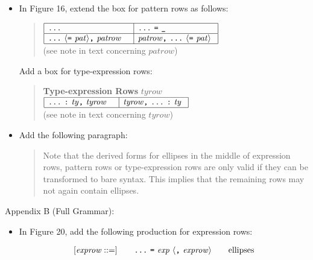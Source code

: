 \documentclass[twoside,titlepage]{article}
\newcommand{\void}[1]{}
\begin{document}
\begin{appendix}
\begin{itemize}
\item In Figure 16, extend the box for pattern rows as follows: 
  \begin{quote}
  $\begin{array}{|l|l|}
  \hline
  \mbox{\tt...}
  & \mbox{\tt...}~\mbox{\tt=}~\mbox{\tt\_} \\
  \hline
  \mbox{\tt...}~\langle\mbox{\tt=}~\mathit{pat}\rangle\mbox{\tt,}~\mathit{patrow}~~~
  & \mathit{patrow}\mbox{\tt,}~\mbox{\tt...}~\langle\mbox{\tt=}~\mathit{pat}\rangle~ \\
  \hline
  \end{array}$ \\
  (see note in text concerning $\mathit{patrow}$)
  \end{quote}
  Add a box for type-expression rows: 
  \begin{quote}
  {\bf Type-expression Rows} $\mathit{tyrow}$ \\
  $\begin{array}{|l|l|}
  \hline
  \mbox{\tt...}~\mbox{\tt:}~\mathit{ty}\mbox{\tt,}~\mathit{tyrow}~~~
  & \mathit{tyrow}\mbox{\tt,}~\mbox{\tt...}~\mbox{\tt:}~\mathit{ty}~ \\
  \hline
  \end{array}$ \\
  (see note in text concerning $\mathit{tyrow}$)
  \end{quote}

\item Add the following paragraph: 
  \begin{quote}
  Note that the derived forms for ellipses in the middle of expression rows, pattern rows or
  type-expression rows are only valid if they can be transformed to bare syntax. This implies
  that the remaining rows may not again contain ellipses.
  \end{quote}
\end{itemize}

Appendix B (Full Grammar):
\begin{itemize}
\item In Figure 20, add the following production for expression rows:%
\void{
\footnote{
Note that we define ellipses in arbitrary position as a derived form, since pattern matching for mid-row ellipses is more complicated to describe in a direct style within the current rules (we would have to thread back the information about what further fields to remove from the row).
}}
  $$
  \begin{array}{l@{\qquad}l@{\qquad}l}
   [\mathit{exprow} ::=] & \mbox{\tt...}~\mbox{\tt=}~\mathit{exp}~\langle\mbox{\tt,}~\mathit{exprow}\rangle & \textrm{ellipses}
  \end{array}
  $$


\end{itemize}
\end{appendix}
\end{document}
